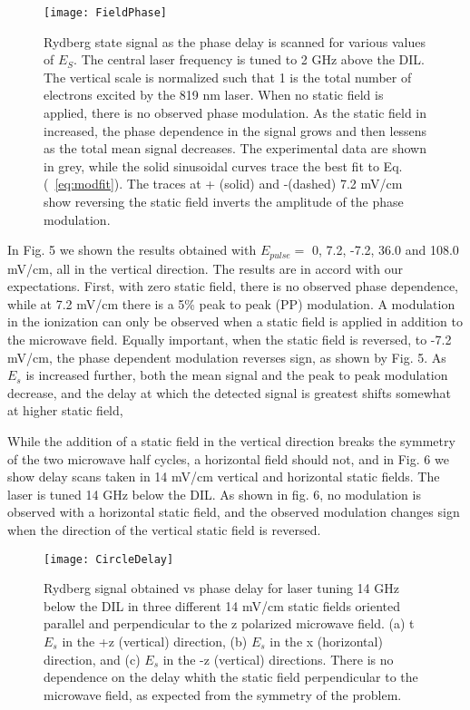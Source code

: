 \documentclass[aps,pra,preprint,groupedaddress]{revtex4-1}
\begin{document}
\begin{figure}
	\texttt{[image: FieldPhase]}
	\caption{Rydberg state signal as the phase delay is scanned for various values of $E_S$. The central laser frequency is tuned to 2 GHz above the DIL. The vertical scale is normalized such that 1 is the total number of electrons excited by the 819 nm laser. When no static field is applied, there is no observed phase modulation. As the static field in increased, the phase dependence in the signal grows and then lessens as the total mean signal decreases. The experimental data are shown in grey, while the solid sinusoidal curves trace the best fit to Eq. (~\ref{eq:modfit}). The traces at + (solid) and -(dashed) 7.2 mV/cm show reversing the static field inverts the amplitude of the phase modulation.}
	\label{fig:fph}
\end{figure}

In Fig. 5 we shown the results obtained with $E_{pulse} =$ 0, 7.2, -7.2, 36.0 and 108.0 mV/cm, all in the vertical direction. The results are in accord with our expectations. First, with zero static field, there is no observed phase dependence, while at 7.2 mV/cm there is a 5\% peak to peak (PP) modulation. A modulation in the ionization can only be observed when a static field is applied in addition to the microwave field. Equally important, when the static field is reversed, to -7.2 mV/cm, the phase dependent modulation reverses sign, as shown by Fig. 5. As $E_s$ is increased further, both the mean signal and the peak to peak modulation decrease, and the delay at which the detected signal is greatest shifts somewhat at higher static field,

While the addition of a static field in the vertical direction breaks the symmetry of the two microwave half cycles, a horizontal field should not, and in Fig. 6 we show delay scans taken in 14 mV/cm vertical and horizontal static fields. The laser is tuned 14 GHz below the DIL. As shown in fig. 6, no modulation is observed with a horizontal static field, and the observed modulation changes sign when the direction of the vertical static field is reversed.

\begin{figure}
	\texttt{[image: CircleDelay]}
	\caption{Rydberg signal obtained vs phase delay for laser tuning 14 GHz below the DIL in three different 14 mV/cm static fields oriented parallel and perpendicular to the z polarized microwave field. (a) t$E_s$ in the +z (vertical) direction, (b) $E_s$ in the x (horizontal) direction, and (c) $E_s$ in the -z (vertical) directions. There is no dependence on the delay whith the static field perpendicular to the microwave field, as expected from the symmetry of the problem. }
	\label{fig:CircleDelay}
\end{figure}
\end{document}
